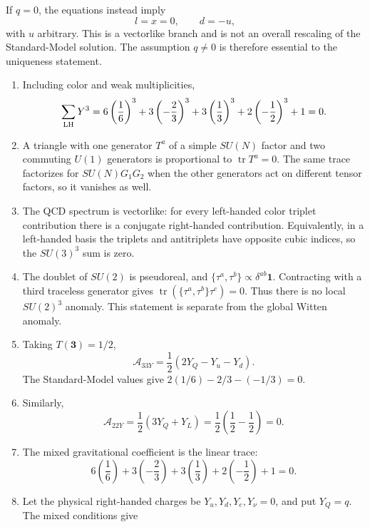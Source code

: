 \begin{enumerate}
  If \(q=0\), the equations instead imply
  \[
    l=x=0,\qquad d=-u,
  \]
  with \(u\) arbitrary.  This is a vectorlike branch and is not an
  overall rescaling of the Standard-Model solution.  The assumption
  \(q\ne0\) is therefore essential to the uniqueness statement.

  \begin{enumerate}
    \item[(a)] Including color and weak multiplicities,
      \[
        \sum_{\rm LH}Y^3
        =6\left(\frac16\right)^3
        +3\left(-\frac23\right)^3
        +3\left(\frac13\right)^3
        +2\left(-\frac12\right)^3+1=0.
      \]
    \item[(b)] A triangle with one generator \(T^a\) of a simple
      \(SU(N)\) factor and two commuting \(U(1)\) generators is
      proportional to \(\operatorname{tr}T^a=0\).  The same trace
      factorizes for \(SU(N)G_1G_2\) when the other generators act on
      different tensor factors, so it vanishes as well.
    \item[(c)] The QCD spectrum is vectorlike: for every left-handed color
      triplet contribution there is a conjugate right-handed contribution.
      Equivalently, in a left-handed basis the triplets and antitriplets
      have opposite cubic indices, so the \(SU(3)^3\) sum is zero.
    \item[(d)] The doublet of \(SU(2)\) is pseudoreal, and
      \(\{\tau^a,\tau^b\}\propto\delta^{ab}\mathbf{1}\).  Contracting with a
      third traceless generator gives
      \(\operatorname{tr}(\{\tau^a,\tau^b\}\tau^c)=0\).
      Thus there is no local \(SU(2)^3\) anomaly.  This statement is
      separate from the global Witten anomaly.
    \item[(e)] Taking \(T(\mathbf3)=1/2\),
      \[
        \mathcal A_{33Y}
          =\frac12(2Y_Q-Y_u-Y_d).
      \]
      The Standard-Model values give
      \(2(1/6)-2/3-(-1/3)=0\).
    \item[(f)] Similarly,
      \[
        \mathcal A_{22Y}
          =\frac12(3Y_Q+Y_L)
          =\frac12\left(\frac12-\frac12\right)=0.
      \]
    \item[(g)] The mixed gravitational coefficient is the linear trace:
      \[
        6\left(\frac16\right)
        +3\left(-\frac23\right)+3\left(\frac13\right)
        +2\left(-\frac12\right)+1=0.
      \]
    \item[(h)] Let the physical right-handed charges be
      \(Y_u,Y_d,Y_e,Y_\nu=0\), and put \(Y_Q=q\).  The mixed conditions give

\end{enumerate}
\end{enumerate}
